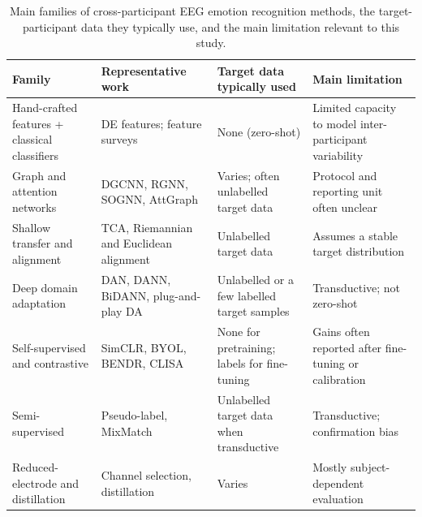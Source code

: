 \begin{table}[!htbp]
  \centering
  {\small\setlength{\tabcolsep}{5pt}
  \begin{tabularx}{\linewidth}{@{}>{\raggedright\arraybackslash}X>{\raggedright\arraybackslash}X>{\raggedright\arraybackslash}X>{\raggedright\arraybackslash}X@{}}
  \toprule
\textbf{Family} & \textbf{Representative work} & \textbf{Target data typically used} & \textbf{Main limitation} \\
\midrule
Hand-crafted features + classical classifiers & DE features\cite{duan,seed}; feature surveys\cite{jenke} & None (zero-shot) & Limited capacity to model inter-participant variability \\
Graph and attention networks & DGCNN\cite{dgcnn}, RGNN\cite{rgnn}, SOGNN\cite{sognn}, AttGraph\cite{attgraph} & Varies; often unlabelled target data & Protocol and reporting unit often unclear \\
Shallow transfer and alignment & TCA\cite{pan}, Riemannian\cite{zanini} and Euclidean\cite{he} alignment & Unlabelled target data & Assumes a stable target distribution \\
Deep domain adaptation & DAN\cite{dan}, DANN\cite{ganin}, BiDANN\cite{bidann}, plug-and-play DA\cite{plugplay} & Unlabelled or a few labelled target samples & Transductive; not zero-shot \\
Self-supervised and contrastive & SimCLR\cite{simclr}, BYOL\cite{byol}, BENDR\cite{bendr}, CLISA\cite{clisa} & None for pretraining; labels for fine-tuning & Gains often reported after fine-tuning or calibration \\
Semi-supervised & Pseudo-label\cite{pseudo}, MixMatch\cite{mixmatch} & Unlabelled target data when transductive & Transductive; confirmation bias \\
Reduced-electrode and distillation & Channel selection\cite{seed}, distillation\cite{hinton} & Varies & Mostly subject-dependent evaluation \\
  \bottomrule
  \end{tabularx}}
  \caption{Main families of cross-participant EEG emotion recognition methods, the target-participant data they typically use, and the main limitation relevant to this study.}
  \label{tab:families}
\end{table}


